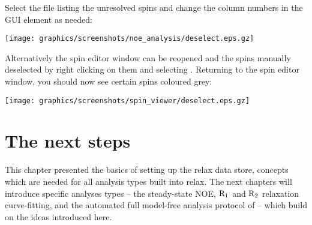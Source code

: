 Select the file listing the unresolved spins and change the column numbers in the  GUI element as needed: 

\begin{minipage}[h]{\linewidth}
\centerline{\texttt{[image: graphics/screenshots/noe\_analysis/deselect.eps.gz]}}
\end{minipage}

Alternatively the spin editor window can be reopened and the spins manually deselected by right clicking on them and selecting .  Returning to the spin editor window, you should now see certain spins coloured grey:

\begin{minipage}[h]{\linewidth}
\centerline{\texttt{[image: graphics/screenshots/spin\_viewer/deselect.eps.gz]}}
\end{minipage}




\section{The next steps}

This chapter presented the basics of setting up the relax data store, concepts which are needed for all analysis types built into relax.  The next chapters will introduce specific analyses types -- the steady-state NOE, $\mathrm{R}_1$ and $\mathrm{R}_2$ relaxation curve-fitting, and the automated full model-free analysis protocol of \citet{dAuvergneGooley07,dAuvergneGooley08b} -- which build on the ideas introduced here.
